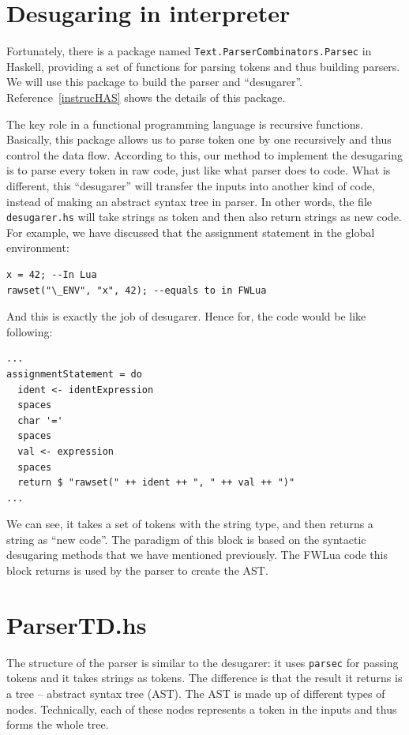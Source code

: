 \section{Desugaring in interpreter}
Fortunately, there is a package named {\tt Text.ParserCombinators.Parsec} in Haskell, providing a set of functions for parsing tokens and thus building parsers. We will use this package to build the parser and ``desugarer''. Reference~\ref{instrucHAS} shows the details of this package.

The key role in a functional programming language is recursive functions. Basically, this package allows us to parse token one by one recursively and thus control the data flow. According to this, our method to implement the desugaring is to parse every token in raw code, just like what parser does to code. What is different, this ``desugarer'' will transfer the inputs into another kind of code, instead of making an abstract syntax tree in parser. In other words, the file {\tt desugarer.hs} will take strings as token and then also return strings as new code. For example, we have discussed that the assignment statement in the global environment:
\begin{verbatim}
x = 42; --In Lua
rawset("\_ENV", "x", 42); --equals to in FWLua
\end{verbatim}
And this is exactly the job of desugarer. Hence for, the code would be like following:
\begin{verbatim}
...
assignmentStatement = do
  ident <- identExpression
  spaces
  char '='
  spaces
  val <- expression
  spaces
  return $ "rawset(" ++ ident ++ ", " ++ val ++ ")"
...
\end{verbatim}

We can see, it takes a set of tokens with the string type, and then returns a string as ``new code''.
The paradigm of this block is based on the syntactic desugaring methods that we have mentioned previously. The FWLua code this block returns is used by the parser to create the AST.

\section{ParserTD.hs}
The structure of the parser is similar to the desugarer: it uses {\tt parsec} for passing tokens and it takes strings as tokens. The difference is that the result it returns is a tree -- abstract syntax tree (AST).
The AST is made up of different types of nodes.
Technically, each of these nodes represents a token in the inputs and thus forms the whole tree.

